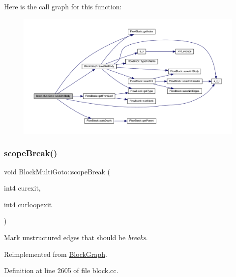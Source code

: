 Here is the call graph for this function\+:
\nopagebreak
\begin{figure}[H]
\begin{center}
\leavevmode
\includegraphics[width=350pt]{class_block_multi_goto_ac537bd161b597061aeca88bcc01e260c_cgraph}
\end{center}
\end{figure}
\mbox{\label{class_block_multi_goto_a1957286b0a3a4a2d280caae3c1f19cc7}} 
\subsubsection{\texorpdfstring{scopeBreak()}{scopeBreak()}}
{\footnotesize\ttfamily void Block\+Multi\+Goto\+::scope\+Break (\begin{DoxyParamCaption}\item[{int4}]{curexit,  }\item[{int4}]{curloopexit }\end{DoxyParamCaption})\hspace{0.3cm}{\ttfamily [virtual]}}



Mark unstructured edges that should be {\itshape breaks}. 



Reimplemented from \mbox{\hyperlink{class_block_graph_a55618dfd49266bd4185d119f08e8b630}{Block\+Graph}}.



Definition at line 2605 of file block.\+cc.

